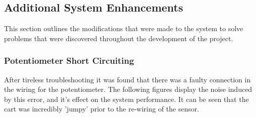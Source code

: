 \documentclass[12pt]{article}
\begin{document}
\subsection{Additional System Enhancements}
This section outlines the modifications that were made to the system to solve problems that were discovered throughout the development of the project.

\subsubsection{Potentiometer Short Circuiting}
After tireless troubleshooting it was found that there was a faulty connection in the wiring for the potentiometer. The following figures display the noise induced by this error, and it's effect on the system performance. It can be seen that the cart was incredibly 'jumpy' prior to the re-wiring of the sensor.
\end{document}
